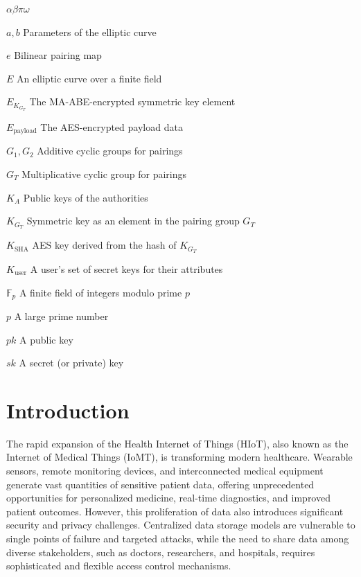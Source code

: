 \documentclass[cic,tc,english]{iiufrgs}
\numberwithin{algorithm}{chapter}
\begin{document}
\begin{listofsymbols}{$\alpha\beta\pi\omega$}
    \item[$a, b$] Parameters of the elliptic curve
    \item[$e$] Bilinear pairing map
    \item[$E$] An elliptic curve over a finite field
    \item[$E_{K_{G_T}}$] The MA-ABE-encrypted symmetric key element
    \item[$E_{\text{payload}}$] The AES-encrypted payload data
    \item[$G_1, G_2$] Additive cyclic groups for pairings
    \item[$G_T$] Multiplicative cyclic group for pairings
    \item[$K_A$] Public keys of the authorities
    \item[$K_{G_T}$] Symmetric key as an element in the pairing group $G_T$
    \item[$K_{\text{SHA}}$] AES key derived from the hash of $K_{G_T}$
    \item[$K_{\text{user}}$] A user's set of secret keys for their attributes
    \item[$\mathbb{F}_p$] A finite field of integers modulo prime $p$
    \item[$p$] A large prime number
    \item[$pk$] A public key
    \item[$sk$] A secret (or private) key
\end{listofsymbols}

\tableofcontents


\chapter{Introduction}
\label{chap:introduction}
    The rapid expansion of the Health Internet of Things (HIoT), also known as the Internet of Medical Things (IoMT), is transforming modern healthcare. Wearable sensors, remote monitoring devices, and interconnected medical equipment generate vast quantities of sensitive patient data, offering unprecedented opportunities for personalized medicine, real-time diagnostics, and improved patient outcomes. However, this proliferation of data also introduces significant security and privacy challenges. Centralized data storage models are vulnerable to single points of failure and targeted attacks, while the need to share data among diverse stakeholders, such as doctors, researchers, and hospitals, requires sophisticated and flexible access control mechanisms.
\end{document}
